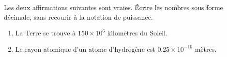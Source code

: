 
\begin{exercice}\label{exo2smath-0204}

    Les deux affirmations suivantes sont vraies. Écrire les nombres sous forme décimale, sans recourir à la notation de puissance.
    \begin{enumerate}
        \item
            La Terre se trouve à \( 150\times 10^6\) kilomètres du Soleil.
        \item
            Le rayon atomique d'un atome d'hydrogène est \( 0.25\times 10^{-10}\) mètres.
    \end{enumerate}

\end{exercice}
